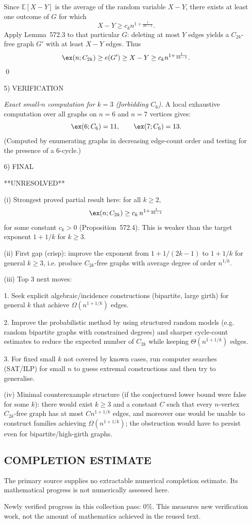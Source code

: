 Since $\mathbb E[X-Y]$ is the average of the random variable $X-Y$, there exists at least one outcome of $G$ for which
\[
X-Y \ge c_k n^{1+\frac{1}{2k-1}}.
\]
Apply Lemma~572.3 to that particular $G$: deleting at most $Y$ edges yields a $C_{2k}$-free graph $G'$ with at least $X-Y$ edges. Thus
\[
\ex(n;C_{2k}) \ge e(G') \ge X-Y \ge c_k n^{1+\frac{1}{2k-1}}.
\]
\qed

5) VERIFICATION

\emph{Exact small-$n$ computation for $k=3$ (forbidding $C_6$).}
A local exhaustive computation over all graphs on $n=6$ and $n=7$ vertices gives:
\[
\ex(6;C_6)=11,\qquad \ex(7;C_6)=13.
\]
(Computed by enumerating graphs in decreasing edge-count order and testing for the presence of a $6$-cycle.)

6) FINAL

**UNRESOLVED**

(i) Strongest proved partial result here: for all $k\ge 2$,
\[
\ex(n;C_{2k}) \ge c_k\,n^{1+\frac{1}{2k-1}}
\]
for some constant $c_k>0$ (Proposition~572.4). This is weaker than the target exponent $1+1/k$ for $k\ge 3$.

(ii) First gap (crisp): improve the exponent from $1+1/(2k-1)$ to $1+1/k$ for general $k\ge 3$, i.e. produce $C_{2k}$-free graphs with average degree of order $n^{1/k}$.

(iii) Top 3 next moves:

1. Seek explicit algebraic/incidence constructions (bipartite, large girth) for general $k$ that achieve $\Omega(n^{1+1/k})$ edges.

2. Improve the probabilistic method by using structured random models (e.g. random bipartite graphs with constrained degrees) and sharper cycle-count estimates to reduce the expected number of $C_{2k}$ while keeping $\Theta(n^{1+1/k})$ edges.

3. For fixed small $k$ not covered by known cases, run computer searches (SAT/ILP) for small $n$ to guess extremal constructions and then try to generalise.

(iv) Minimal counterexample structure (if the conjectured lower bound were false for some $k$): there would exist $k\ge 3$ and a constant $C$ such that every $n$-vertex $C_{2k}$-free graph has at most $C n^{1+1/k}$ edges, and moreover one would be unable to construct families achieving $\Omega(n^{1+1/k})$; the obstruction would have to persist even for bipartite/high-girth graphs.


\subsection*{COMPLETION ESTIMATE}
The primary source supplies no extractable numerical completion estimate. Its mathematical progress is not numerically assessed here.

Newly verified progress in this collection pass: $0\%$. This measures new verification work, not the amount of mathematics achieved in the reused text.
